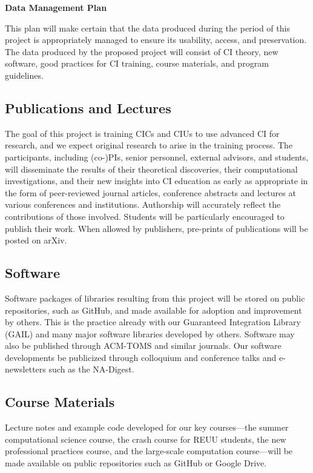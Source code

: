 \documentclass[11pt]{NSFamsart}
\begin{document}
\newpage \setcounter{page}{1} %

\centerline{\textbf{\Large Data Management Plan}}
\hypertarget{DataManage}{}

\bigskip



This plan will make certain that the data produced during the period of this project is appropriately managed to ensure its usability, access, and preservation.  The data produced by the proposed project will consist of CI theory, new software, good practices for CI training, course materials, and program guidelines. 

\subsection*{Publications and Lectures}  The goal of this project is training CICs and CIUs to use advanced CI for research, and we expect original research to arise in the training process.  The participants, including (co-)PIs, senior personnel, external advisors, and students, will disseminate the results of their theoretical discoveries, their computational investigations, and their new insights into CI education as early as appropriate in the form of peer-reviewed journal articles, conference abstracts and lectures at various conferences and institutions. Authorship will accurately 
reflect the contributions of those involved.  Students will be particularly encouraged to publish their work. When allowed by publishers, pre-prints of publications will be posted on arXiv.

\subsection*{Software}
Software packages of libraries resulting from this project will be stored on public repositories, such as GitHub, and made available for adoption and improvement by others.  This is the practice already with our Guaranteed
Integration Library (GAIL) \cite{ChoEtal17b} and many major software libraries developed by others.  Software may also be published through ACM-TOMS and similar journals. Our software developments be publicized through colloquium and 
conference talks and e-newsletters such as the NA-Digest.

\subsection*{Course Materials} Lecture notes and example code developed for our key courses---the summer computational science course, the crash course for REUU students, the new professional practices course, and the large-scale computation course---will be made available on public repositories such as GitHub or Google Drive.
\end{document}
